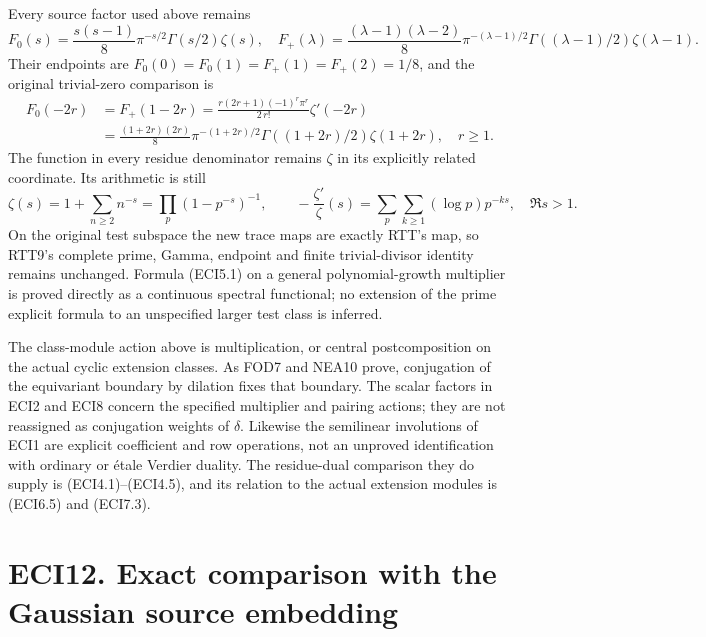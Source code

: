 Every source factor used above remains \[
F_0(s)=\frac{s(s-1)}8\pi^{-s/2}\Gamma(s/2)\zeta(s),
\quad
F_+(\lambda)=\frac{(\lambda-1)(\lambda-2)}8
\pi^{-(\lambda-1)/2}\Gamma((\lambda-1)/2)\zeta(\lambda-1).
\tag{ECI11.1}
\] Their endpoints are \(F_0(0)=F_0(1)=F_+(1)=F_+(2)=1/8\), and the
original trivial-zero comparison is \[
\begin{aligned}
F_0(-2r)&=F_+(1-2r)
=\frac{r(2r+1)(-1)^r\pi^r}{2\,r!}\zeta'(-2r)
\\&=\frac{(1+2r)(2r)}8\pi^{-(1+2r)/2}
\Gamma((1+2r)/2)\zeta(1+2r),\quad r\ge1.
\end{aligned}
\tag{ECI11.2}
\] The function in every residue denominator remains \(\zeta\) in its
explicitly related coordinate. Its arithmetic is still \[
\zeta(s)=1+\sum_{n\ge2}n^{-s}=\prod_p(1-p^{-s})^{-1},
\qquad -\frac{\zeta'}\zeta(s)=\sum_p\sum_{k\ge1}(\log p)p^{-ks},
\quad\Re s>1.
\tag{ECI11.3}
\] On the original test subspace the new trace maps are exactly RTT's
map, so RTT9's complete prime, Gamma, endpoint and finite
trivial-divisor identity remains unchanged. Formula (ECI5.1) on a
general polynomial-growth multiplier is proved directly as a continuous
spectral functional; no extension of the prime explicit formula to an
unspecified larger test class is inferred.

The class-module action above is multiplication, or central
postcomposition on the actual cyclic extension classes. As FOD7 and
NEA10 prove, conjugation of the equivariant boundary by dilation fixes
that boundary. The scalar factors in ECI2 and ECI8 concern the specified
multiplier and pairing actions; they are not reassigned as conjugation
weights of \(\delta\). Likewise the semilinear involutions of ECI1 are
explicit coefficient and row operations, not an unproved identification
with ordinary or étale Verdier duality. The residue-dual comparison they
do supply is (ECI4.1)--(ECI4.5), and its relation to the actual
extension modules is (ECI6.5) and (ECI7.3).

\section{ECI12. Exact comparison with the Gaussian source
embedding}\label{eci12.-exact-comparison-with-the-gaussian-source-embedding}

